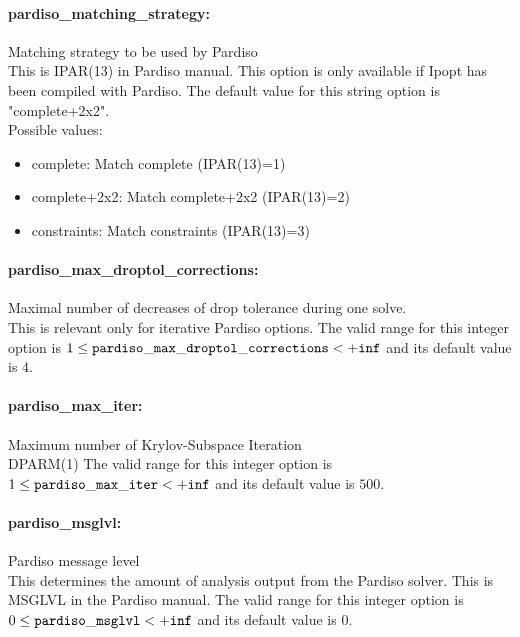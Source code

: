 \paragraph{pardiso\_matching\_strategy:}\label{opt:pardiso_matching_strategy} Matching strategy to be used by Pardiso \\
 This is IPAR(13) in Pardiso manual.  This option is only available if Ipopt has been compiled with Pardiso. The default value for this string option is "complete+2x2".
\\ 
Possible values:
\begin{itemize}
   \item complete: Match complete (IPAR(13)=1)
   \item complete+2x2: Match complete+2x2 (IPAR(13)=2)
   \item constraints: Match constraints (IPAR(13)=3)
\end{itemize}

\paragraph{pardiso\_max\_droptol\_corrections:}\label{opt:pardiso_max_droptol_corrections} Maximal number of decreases of drop tolerance during one solve. \\
 This is relevant only for iterative Pardiso options. The valid range for this integer option is
$1 \le {\tt pardiso\_max\_droptol\_corrections } <  {\tt +inf}$
and its default value is $4$.


\paragraph{pardiso\_max\_iter:}\label{opt:pardiso_max_iter} Maximum number of Krylov-Subspace Iteration \\
 DPARM(1) The valid range for this integer option is
$1 \le {\tt pardiso\_max\_iter } <  {\tt +inf}$
and its default value is $500$.


\paragraph{pardiso\_msglvl:}\label{opt:pardiso_msglvl} Pardiso message level \\
 This determines the amount of analysis output from the Pardiso solver. This is MSGLVL in the Pardiso manual. The valid range for this integer option is
$0 \le {\tt pardiso\_msglvl } <  {\tt +inf}$
and its default value is $0$.



